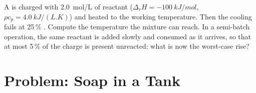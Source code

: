 \begin{exercise}[$\star\star\star$]\label{exo:b2:continuous-reactors:12}
A  is charged with \qty{2.0}{mol/L} of reactant ($\Delta_r H =
\qty{-100}{kJ/mol}$, $\rho c_p = \qty{4.0}{kJ/(L.K)}$) and heated to the
working temperature. Then the cooling fails at 25\,\% . Compute the
temperature the mixture can reach. In a semi-batch operation, the same
reactant is added slowly and consumed as it arrives, so that at most 5\,\%
of the charge is present unreacted: what is now the worst-case rise?
\end{exercise}

\section{Problem: Soap in a Tank}

